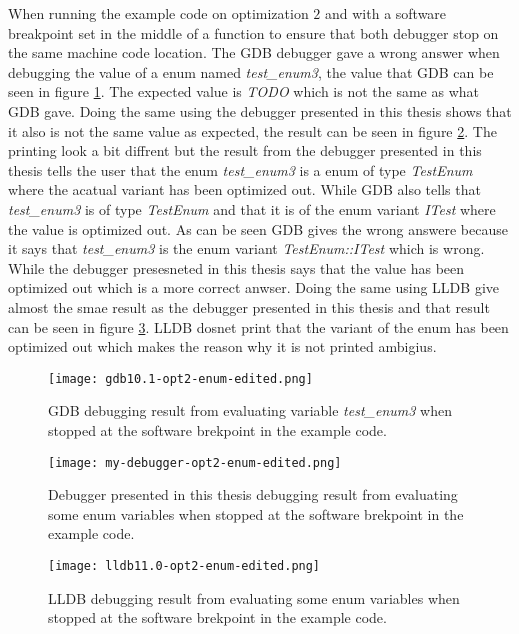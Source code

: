 When running the example code on optimization $2$ and with a software breakpoint set in the middle of a function to ensure that both debugger stop on the same machine code location.
The \gls{GDB} debugger gave a wrong answer when debugging the value of a enum named \emph{test\_enum3}, the value that \gls{GDB} can be seen in figure \ref{fig:gdbenum}.
The expected value is \emph{TODO} which is not the same as what \gls{GDB} gave.
Doing the same using the debugger presented in this thesis shows that it also is not the same value as expected, the result can be seen in  figure \ref{fig:mydebuggerenum}.
The printing look a bit diffrent but the result from the debugger presented in this thesis tells the user that the enum \emph{test\_enum3} is a enum of type \emph{TestEnum} where the acatual variant has been optimized out.
While \gls{GDB} also tells that \emph{test\_enum3} is of type \emph{TestEnum} and that it is of the enum variant \emph{ITest} where the value is optimized out.
As can be seen \gls{GDB} gives the wrong answere because it says that \emph{test\_enum3} is the enum variant \emph{TestEnum::ITest} which is wrong.
While the debugger presesneted in this thesis says that the value has been optimized out which is a more correct anwser.
Doing the same using \gls{LLDB} give almost the smae result as the debugger presented in this thesis and that result can be seen in figure \ref{fig:lldbenum}.
\gls{LLDB} dosnet print that the variant of the enum has been optimized out which makes the reason why it is not printed ambigius.


\begin{figure}[h]
	\centering
	\texttt{[image: gdb10.1-opt2-enum-edited.png]}
	\caption{\gls{GDB} debugging result from evaluating variable \emph{test\_enum3} when stopped at the software brekpoint in the example code.}
	\label{fig:gdbenum}
\end{figure}


\begin{figure}[h]
	\centering
	\texttt{[image: my-debugger-opt2-enum-edited.png]}
	\caption{Debugger presented in this thesis debugging result from evaluating some enum variables when stopped at the software brekpoint in the example code.}
	\label{fig:mydebuggerenum}
\end{figure}


\begin{figure}[h]
	\centering
	\texttt{[image: lldb11.0-opt2-enum-edited.png]}
	\caption{\gls{LLDB} debugging result from evaluating some enum variables when stopped at the software brekpoint in the example code.}
	\label{fig:lldbenum}
\end{figure}


